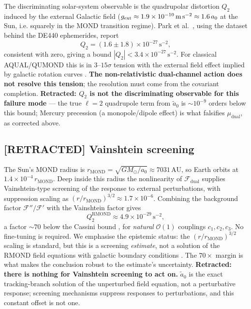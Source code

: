 \documentclass[aps,prd,preprint,superscriptaddress,nofootinbib,amsmath,amssymb,floatfix]{revtex4-2}
\makeatletter
\DeclareRobustCommand{\_}{%
    \ifmmode\nfss@text{\textunderscore}\else\textunderscore\penalty\z@\fi}%
\makeatother
\begin{document}
The discriminating solar-system observable is the quadrupolar distortion $Q_2$ induced by the external Galactic field ($g_{\text{ext}} \approx 1.9\times10^{-10}\,\text{m\,s}^{-2} \approx 1.6\,a_0$ at the Sun, i.e. squarely in the MOND transition regime). Park et al.~\cite{Park2026}, using the dataset behind the DE440 ephemerides, report
\begin{equation}
Q_2 = (1.6 \pm 1.8)\times10^{-27}\,\text{s}^{-2},
\end{equation}
consistent with zero, giving a bound $|Q_2| < 3.4\times10^{-27}\,\text{s}^{-2}$. For classical AQUAL/QUMOND this is in $3$--$15\sigma$ tension with the external field effect implied by galactic rotation curves . \textbf{The non-relativistic dual-channel action does not resolve this tension}; the resolution must come from the covariant completion. \textbf{Retracted: $Q_2$ is not the discriminating observable for this failure mode} — the true $\ell=2$ quadrupole term from $\tilde a_0$ is $\sim10^{-9}$ orders below this bound; Mercury precession (a monopole/dipole effect) is what falsifies $\mu_{\text{dual}}$, as corrected above.

\subsection*{[RETRACTED] Vainshtein screening}

The Sun's MOND radius is $r_{\text{MOND}} = \sqrt{GM_\odot/a_0} \approx 7031\,\text{AU}$, so Earth orbits at $1.4\times10^{-4}\,r_{\text{MOND}}$. Deep inside this radius the nonlinearity of $\mathcal{F}_{\text{dual}}$ supplies Vainshtein-type screening \cite{Vainshtein1972} of the response to external perturbations, with suppression scaling as $(r/r_{\text{MOND}})^{3/2} \approx 1.7\times10^{-6}$. Combining the background factor $\mathcal{F}''/\mathcal{F}'$ with the Vainshtein factor gives
\begin{equation}
Q_2^{\text{RMOND}} \approx 4.9\times10^{-29}\,\text{s}^{-2},
\end{equation}
a factor $\sim70$ below the Cassini bound , for \emph{natural} $\mathcal{O}(1)$ couplings $c_1,c_2,c_3$. No fine-tuning is required. We emphasise the epistemic status: the $(r/r_{\text{MOND}})^{3/2}$ scaling is standard, but this is a screening \emph{estimate}, not a solution of the RMOND field equations with galactic boundary conditions . The $70\times$ margin is what makes the conclusion robust to the estimate's uncertainty. \textbf{Retracted: there is nothing for Vainshtein screening to act on.} $\tilde a_0$ is the exact tracking-branch solution of the unperturbed field equation, not a perturbative response; screening mechanisms suppress responses to perturbations, and this constant offset is not one.
\end{document}
